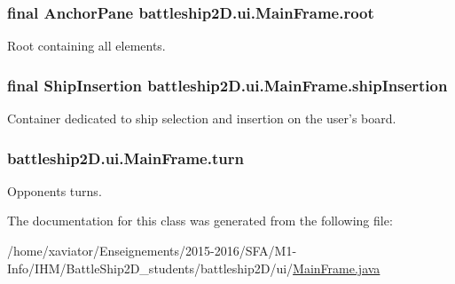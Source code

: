 \hypertarget{classbattleship2D_1_1ui_1_1MainFrame_aae9a45c1d1839f003199eb9ea4c08af6}{
\subsubsection[{root}]{\setlength{\rightskip}{0pt plus 5cm}final Anchor\-Pane battleship2\-D.\-ui.\-Main\-Frame.\-root\hspace{0.3cm}{\ttfamily [private]}}}\label{classbattleship2D_1_1ui_1_1MainFrame_aae9a45c1d1839f003199eb9ea4c08af6}


Root containing all elements. 

\hypertarget{classbattleship2D_1_1ui_1_1MainFrame_ae6d2708cb3afd8f74c0ee1cf09023dff}{
\subsubsection[{ship\-Insertion}]{\setlength{\rightskip}{0pt plus 5cm}final {\bf Ship\-Insertion} battleship2\-D.\-ui.\-Main\-Frame.\-ship\-Insertion\hspace{0.3cm}{\ttfamily [private]}}}\label{classbattleship2D_1_1ui_1_1MainFrame_ae6d2708cb3afd8f74c0ee1cf09023dff}


Container dedicated to ship selection and insertion on the user's board. 

\hypertarget{classbattleship2D_1_1ui_1_1MainFrame_a7bd357e0fef24dee7bf1fd97cf199b81}{
\subsubsection[{turn}]{ battleship2\-D.\-ui.\-Main\-Frame.\-turn\hspace{0.3cm}{\ttfamily [private]}}}\label{classbattleship2D_1_1ui_1_1MainFrame_a7bd357e0fef24dee7bf1fd97cf199b81}


Opponents turns. 



The documentation for this class was generated from the following file\-:\begin{DoxyCompactItemize}
\item 
/home/xaviator/\-Enseignements/2015-\/2016/\-S\-F\-A/\-M1-\/\-Info/\-I\-H\-M/\-Battle\-Ship2\-D\-\_\-students/battleship2\-D/ui/\hyperlink{MainFrame_8java}{Main\-Frame.\-java}\end{DoxyCompactItemize}

